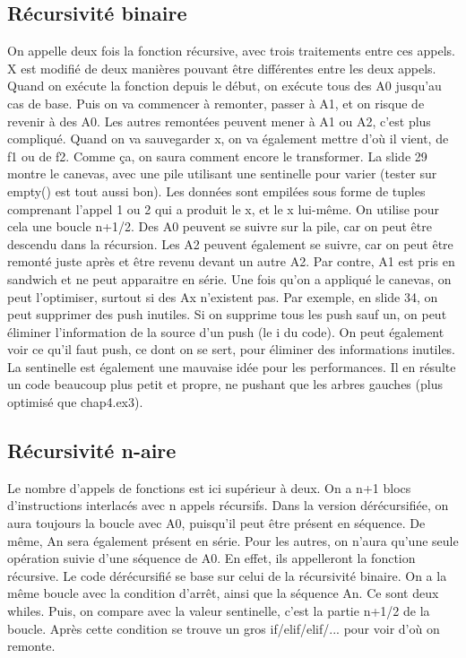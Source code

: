 \documentclass[10pt]{article}
\begin{document}
\subsection{Récursivité binaire}
On appelle deux fois la fonction récursive, avec trois traitements entre ces appels. X est modifié de deux manières pouvant être différentes entre les deux appels.  
\newline \newline 
Quand on exécute la fonction depuis le début, on exécute tous des A0 jusqu'au cas de base. Puis on va commencer à remonter, passer à A1, et on risque de revenir à des A0. Les autres remontées peuvent mener à A1 ou A2, c'est plus compliqué. Quand on va sauvegarder x, on va également mettre d'où il vient, de f1 ou de f2. Comme ça, on saura comment encore le transformer. 
\newline \newline 
La slide 29 montre le canevas, avec une pile utilisant une sentinelle pour varier (tester sur empty() est tout aussi bon). Les données sont empilées sous forme de tuples comprenant l'appel 1 ou 2 qui a produit le x, et le x lui-même. On utilise pour cela une boucle n+1/2. 
\newline \newline 
Des A0 peuvent se suivre sur la pile, car on peut être descendu dans la récursion. Les A2 peuvent également se suivre, car on peut être remonté juste après et être revenu devant un autre A2. Par contre, A1 est pris en sandwich et ne peut apparaitre en série. 
\newline \newline 
Une fois qu'on a appliqué le canevas, on peut l'optimiser, surtout si des Ax n'existent pas. Par exemple, en slide 34, on peut supprimer des push inutiles. Si on supprime tous les push sauf un, on peut éliminer l'information de la source d'un push (le i du code). On peut également voir ce qu'il faut push, ce dont on se sert, pour éliminer des informations inutiles. La sentinelle est également une mauvaise idée pour les performances. Il en résulte un code beaucoup plus petit et propre, ne pushant que les arbres gauches (plus optimisé que chap4.ex3).
\subsection{Récursivité n-aire}
Le nombre d'appels de fonctions est ici supérieur à deux. On a n+1 blocs d'instructions interlacés avec n appels récursifs. Dans la version dérécursifiée, on aura toujours la boucle avec A0, puisqu'il peut être présent en séquence. De même, An sera également présent en série. Pour les autres, on n'aura qu'une seule opération suivie d'une séquence de A0. En effet, ils appelleront la fonction récursive. 
\newline \newline 
Le code dérécursifié se base sur celui de la récursivité binaire. On a la même boucle avec la condition d'arrêt, ainsi que la séquence An. Ce sont deux whiles. Puis, on compare avec la valeur sentinelle, c'est la partie n+1/2 de la boucle. Après cette condition se trouve un gros if/elif/elif/... pour voir d'où on remonte.
\end{document}
